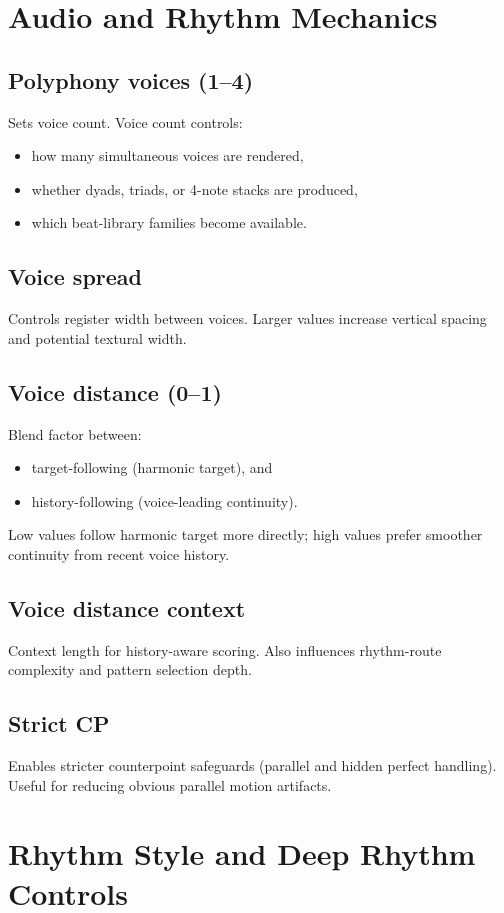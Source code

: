 \documentclass[11pt,a4paper]{article}
\begin{document}
\section{Audio and Rhythm Mechanics}
\subsection*{Polyphony voices (1--4)}
Sets voice count. Voice count controls:
\begin{itemize}
  \item how many simultaneous voices are rendered,
  \item whether dyads, triads, or 4-note stacks are produced,
  \item which beat-library families become available.
\end{itemize}

\subsection*{Voice spread}
Controls register width between voices. Larger values increase vertical spacing and potential textural width.

\subsection*{Voice distance (0--1)}
Blend factor between:
\begin{itemize}
  \item target-following (harmonic target), and
  \item history-following (voice-leading continuity).
\end{itemize}
Low values follow harmonic target more directly; high values prefer smoother continuity from recent voice history.

\subsection*{Voice distance context}
Context length for history-aware scoring. Also influences rhythm-route complexity and pattern selection depth.

\subsection*{Strict CP}
Enables stricter counterpoint safeguards (parallel and hidden perfect handling). Useful for reducing obvious parallel motion artifacts.

\section{Rhythm Style and Deep Rhythm Controls}
\end{document}
